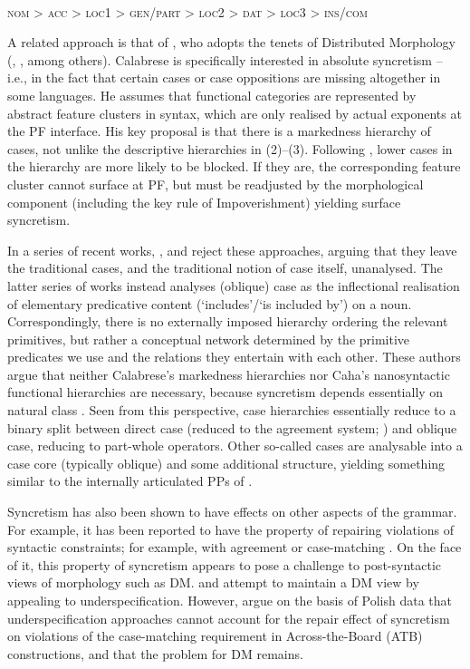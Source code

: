 \documentclass[output=paper]{langsci/langscibook}
\begin{document}
\ea%
\label{ex:intro:3}\citep[32]{Caha2009}\\
\textsc{nom > acc > loc1 > gen/part > loc2 > dat > loc3 > ins/com}
\z

A related approach is that of \citet{Calabrese2008}, who adopts the tenets of Distributed Morphology (\citealt{Halle1993}, \citealt{Embick2006}, among others). Calabrese is specifically interested in absolute syncretism – i.e., in the fact that certain cases or case oppositions are missing altogether in some languages. He assumes that functional categories are represented by abstract feature clusters in syntax, which are only realised by actual exponents at the PF interface. His key proposal is that there is a markedness hierarchy of cases, not unlike the descriptive hierarchies in (2)–(3). Following \citet{Blake2001}, lower cases in the hierarchy are more likely to be blocked. If they are, the corresponding feature cluster cannot surface at PF, but must be readjusted by the morphological component (including the key rule of Impoverishment) yielding surface syncretism.

In a series of recent works, \citet{Manzini2011Grammatical}, \citet{Manzini2016} and \citet{Franco2017} reject these approaches, arguing that they leave the traditional cases, and the traditional notion of case itself, unanalysed. The latter series of works instead analyses (oblique) case as the inflectional realisation of elementary predicative content (‘includes’\slash ‘is included by’) on a noun. Correspondingly, there is no externally imposed hierarchy ordering the relevant primitives, but rather a conceptual network determined by the primitive predicates we use and the relations they entertain with each other. These authors argue that neither Calabrese’s markedness hierarchies nor Caha’s nanosyntactic functional hierarchies are necessary, because syncretism depends essentially on natural class \citep{Müller2007}. Seen from this perspective, case hierarchies essentially reduce to a binary split between direct case (reduced to the agreement system; \citealt{Chomsky2001Derivation}) and oblique case, reducing to part-whole operators. Other so-called cases are analysable into a case core (typically oblique) and some additional structure, yielding something similar to the internally articulated PPs of \citet{Svenonius2006}.

Syncretism has also been shown to have effects on other aspects of the grammar. For example, it has been reported to have the property of repairing violations of syntactic constraints; for example, with agreement \citep{Schütze2003,Bhatt2013} or case-matching \citep{Citko2005,Craenenbroeck2012,Hein2016}. On the face of it, this property of syncretism appears to pose a challenge to post-syntactic views of morphology such as DM. \citet{Citko2005} and \citet{Asarina2011} attempt to maintain a DM view by appealing to underspecification. However, \citet{Hein2016} argue on the basis of Polish data that underspecification approaches cannot account for the repair effect of syncretism on violations of the case-matching requirement in Across-the-Board (ATB) constructions, and that the problem for DM remains.
\end{document}
